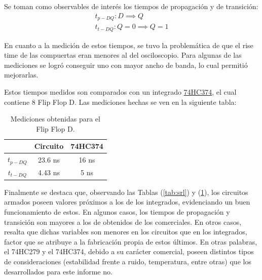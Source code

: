 Se toman como observables de interés los tiempos de propagación y de transición:
\begin{equation*}
\begin{split}
	t_{p-DQ}: D \implies Q \\
	t_{t-DQ}: Q=0 \implies Q = 1
\end{split}
\end{equation*}
 
En cuanto a la medición de estos tiempos, se tuvo la problemática de que el rise time de las compuertas eran menores al del osciloscopio. Para algunas de las mediciones se logró conseguir uno con mayor ancho de banda, lo cual permitió mejorarlas.

Estos tiempos medidos son comparados con un integrado \href{https://pdf1.alldatasheet.com/datasheet-pdf/view/15593/PHILIPS/74HC374.html}{74HC374}, el cual contiene 8 Flip Flop D. Las mediciones hechas se ven en la siguiente tabla:
\begin{table}[H]
\centering
\begin{tabular}{ccc}
\hline
\textit{}                               & \textbf{Circuito}         & \textbf{74HC374}     \\ \hline
\textbf{$t_{p-DQ}$}                     & 23.6 ns                    & 16 ns                 \\
\textbf{$t_{t-DQ}$}                     & 4.43 ns                    & 5 ns                  \\
\hline
\end{tabular}
\caption{Mediciones obtenidas para el Flip Flop D.}
\label{tab:ffd}
\end{table}

Finalmente se destaca que, observando las Tablas (\ref{tab:srl}) y (\ref{tab:ffd}), los circuitos armados poseen valores próximos a los de los integrados, evidenciando un buen funcionamiento de estos. En algunos casos, los tiempos de propagación y transición son mayores a los de obtenidos de los comerciales. En otros casos, resalta que dichas variables son menores en los circuitos que en los integrados, factor que se atribuye a la fabricación propia de estos últimos. En otras palabras, el 74HC279 y el 74HC374, debido a su carácter comercial, poseen distintos tipos de consideraciones (estabilidad frente a ruido, temperatura, entre otras) que los desarrollados para este informe no.